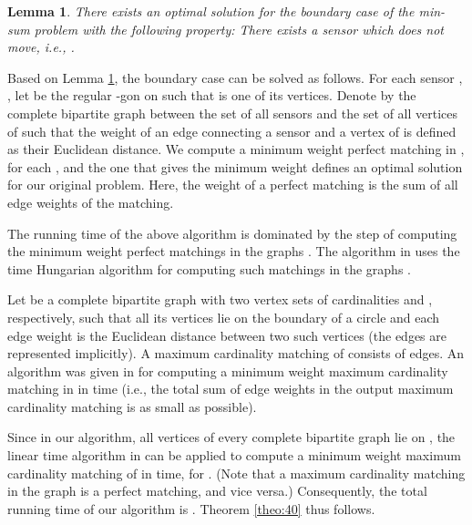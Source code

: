 \documentclass[11pt]{article}
\newtheorem{Lem}{Lemma}
\begin{document}
\begin{Lem}\cite{ref:TanNe10}
\label{lem-not-move}
There exists an optimal solution for the boundary case of the
min-sum problem with the following property: There exists a sensor  which
does not move, i.e., .
\end{Lem}

Based on Lemma \ref{lem-not-move}, the boundary case can be solved as
follows. For each sensor , , let  be
the regular -gon on  such that  is one of its
vertices. Denote by  the complete bipartite graph between the
set of all sensors and the set of all vertices of  such
that the weight of an edge connecting a sensor and a vertex of
 is defined as their Euclidean distance. We compute a
minimum weight perfect matching  in , for each , and the one that gives the minimum weight defines an
optimal solution for our original problem. Here, the weight of a
perfect matching is the sum of all edge weights of the matching.

The running time of the above algorithm is dominated by the step of
computing the minimum weight perfect matchings in the graphs .
The algorithm in \cite{ref:TanNe10} uses the  time
Hungarian algorithm for computing such matchings in the graphs .

Let  be a complete bipartite graph with two vertex sets of
cardinalities  and , respectively, such that all its vertices
lie on the boundary of a circle and each edge weight is the
Euclidean distance between two such vertices (the edges are
represented implicitly). A maximum cardinality matching of  consists of
 edges. An algorithm was given in
\cite{ref:BussLi98} for computing a
minimum weight maximum cardinality matching in  in  time (i.e., the total sum
of edge weights in the output maximum cardinality matching is as small as possible).

Since in our algorithm, all vertices of every complete bipartite
graph  lie on , the linear time algorithm in
\cite{ref:BussLi98} can be applied to compute a minimum weight
maximum cardinality matching of  in  time, for
. (Note that a maximum
cardinality matching in the graph  is a perfect matching, and vice versa.)
Consequently, the total running time of our algorithm is .
Theorem \ref{theo:40} thus follows.
\end{document}
